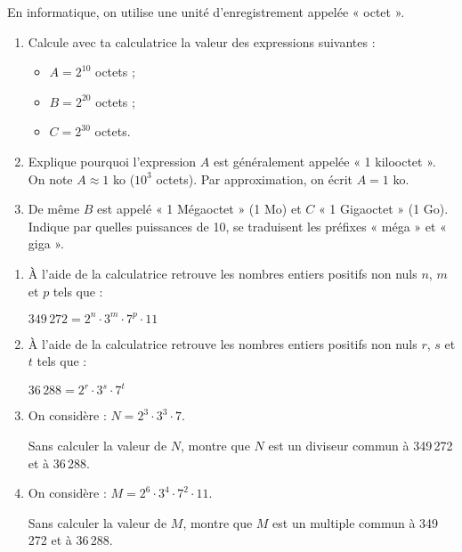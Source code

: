 \begin{exercice}
En informatique, on utilise une unité d'enregistrement appelée « octet ».
\begin{enumerate}
 \item Calcule avec ta calculatrice la valeur des expressions suivantes :
 \begin{itemize}
  \item $A = 2^{10}$ octets ;
  \item $B = 2^{20}$ octets ;
  \item $C = 2^{30}$ octets.
  \end{itemize}
 \item Explique pourquoi l'expression $A$ est généralement appelée « 1 kilooctet ». On note $A \approx 1$ ko ($10^3$ octets). Par approximation, on écrit $A = 1$ ko.
 \item De même $B$ est appelé « 1 Mégaoctet » (1 Mo) et $C$ « 1 Gigaoctet » (1 Go). Indique par quelles puissances de 10, se traduisent les préfixes « méga » et « giga ». 
 \end{enumerate}
\end{exercice}


\begin{exercice}
\begin{enumerate}
 \item À l'aide de la calculatrice retrouve les nombres entiers positifs non nuls $n$, $m$ et $p$ tels que :
 
 \begin{center} $349\,272 = 2^n \cdot 3^m \cdot 7^p \cdot 11$ \end{center}

 \item À l'aide de la calculatrice retrouve les nombres entiers positifs non nuls $r$, $s$ et $t$ tels que :
 
 \begin{center} $36\,288 = 2^r \cdot 3^s \cdot 7^t$ \end{center}
 
 \item On considère : $N = 2^3 \cdot 3^3 \cdot 7$.
 
Sans calculer la valeur de $N$, montre que $N$ est un diviseur commun à 349\,272 et à 36\,288.

 \item On considère : $M = 2^6 \cdot 3^4 \cdot 7^2 \cdot 11$.
 
Sans calculer la valeur de $M$, montre que $M$ est un multiple commun à 349\,272 et à 36\,288.
 \end{enumerate}
\end{exercice}


